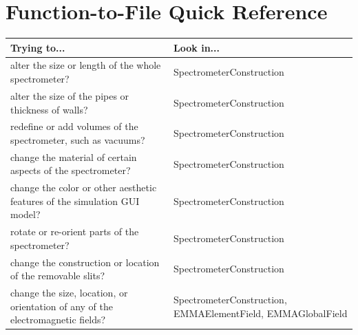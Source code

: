 \documentclass{article}
\begin{document}
\section{Function-to-File Quick Reference}

\begin{longtable}[c]{|p{6 cm}|p{6 cm}|}
\hline
Trying to... & Look in... \\
\hline
alter the size or length of the whole spectrometer?                                                    & SpectrometerConstruction                                                                                                         \\ \hline
alter the size of the pipes or thickness of walls?                                                     & SpectrometerConstruction                                                                                                         \\ \hline
redefine or add volumes of the spectrometer, such as vacuums?                                          & SpectrometerConstruction                                                                                                         \\ \hline
change the material of certain aspects of the spectrometer?                                            & SpectrometerConstruction                                                                                                         \\ \hline
change the color or other aesthetic features of the simulation GUI model?                              & SpectrometerConstruction                                                                                                         \\ \hline
rotate or re-orient parts of the spectrometer?                                                         & SpectrometerConstruction                                                                                                         \\ \hline
change the construction or location of the removable slits?                                            & SpectrometerConstruction                                                                                                         \\ \hline
change the size, location, or orientation of any of the electromagnetic fields?                        & SpectrometerConstruction, EMMAElementField, EMMAGlobalField                                                                      \\ \hline

\end{longtable}
\end{document}
